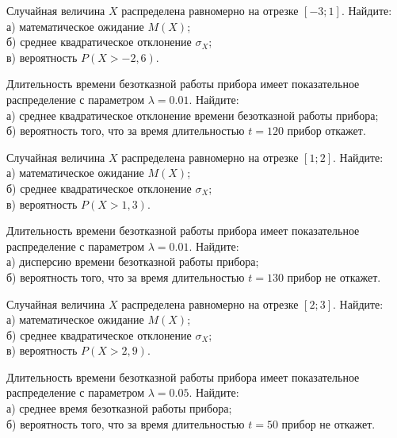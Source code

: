 \vfill

\newpage\setcounter{zad}{0}

\z Случайная величина $X$ распределена равномерно на отрезке $[-3; 1]$. Найдите: \\ \quad а) математическое ожидание $M(X)$; \\ \quad б) среднее квадратическое отклонение $\sigma_X$; \\ \quad в) вероятность $P(X>-2{,}6)$.


\vfill

\z Длительность времени безотказной работы прибора имеет показательное распределение с параметром $\lambda = 0.01$. Найдите: \\ \quad а) среднее квадратическое отклонение времени безотказной работы прибора; \\ \quad б) вероятность того, что за время длительностью $t = 120$ прибор откажет.
 

\vfill

\newpage\setcounter{zad}{0}

\z Случайная величина $X$ распределена равномерно на отрезке $[1; 2]$. Найдите: \\ \quad а) математическое ожидание $M(X)$; \\ \quad б) среднее квадратическое отклонение $\sigma_X$; \\ \quad в) вероятность $P(X>1{,}3)$.


\vfill

\z Длительность времени безотказной работы прибора имеет показательное распределение с параметром $\lambda = 0.01$. Найдите: \\ \quad а) дисперсию времени безотказной работы прибора; \\ \quad б) вероятность того, что за время длительностью $t = 130$ прибор не откажет.
 

\vfill

\newpage\setcounter{zad}{0}

\z Случайная величина $X$ распределена равномерно на отрезке $[2; 3]$. Найдите: \\ \quad а) математическое ожидание $M(X)$; \\ \quad б) среднее квадратическое отклонение $\sigma_X$; \\ \quad в) вероятность $P(X>2{,}9)$.


\vfill

\z Длительность времени безотказной работы прибора имеет показательное распределение с параметром $\lambda = 0.05$. Найдите: \\ \quad а) среднее время безотказной работы прибора; \\ \quad б) вероятность того, что за время длительностью $t = 50$ прибор не откажет.
 

